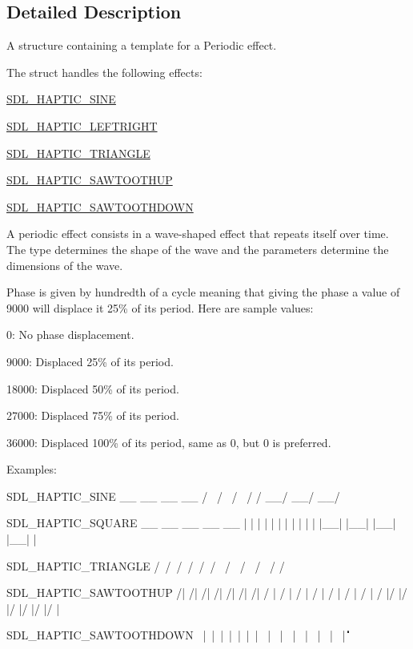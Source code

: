 \subsection{Detailed Description}
A structure containing a template for a Periodic effect. 

The struct handles the following effects\-:
\begin{DoxyItemize}
\item \hyperlink{_s_d_l__haptic_8h_aa6d75adbfcdda5075078e7a2849da5c0}{S\-D\-L\-\_\-\-H\-A\-P\-T\-I\-C\-\_\-\-S\-I\-N\-E}
\item \hyperlink{_s_d_l__haptic_8h_ae047624d8458ff6400887c37a36f86d3}{S\-D\-L\-\_\-\-H\-A\-P\-T\-I\-C\-\_\-\-L\-E\-F\-T\-R\-I\-G\-H\-T}
\item \hyperlink{_s_d_l__haptic_8h_ae8123eaa51511507375ba6ef9220fa46}{S\-D\-L\-\_\-\-H\-A\-P\-T\-I\-C\-\_\-\-T\-R\-I\-A\-N\-G\-L\-E}
\item \hyperlink{_s_d_l__haptic_8h_ab8e3f40f3c2bcee8905d13b634363c3f}{S\-D\-L\-\_\-\-H\-A\-P\-T\-I\-C\-\_\-\-S\-A\-W\-T\-O\-O\-T\-H\-U\-P}
\item \hyperlink{_s_d_l__haptic_8h_afd64aa747034a7ccf4b55f6246525701}{S\-D\-L\-\_\-\-H\-A\-P\-T\-I\-C\-\_\-\-S\-A\-W\-T\-O\-O\-T\-H\-D\-O\-W\-N}
\end{DoxyItemize}

A periodic effect consists in a wave-\/shaped effect that repeats itself over time. The type determines the shape of the wave and the parameters determine the dimensions of the wave.

Phase is given by hundredth of a cycle meaning that giving the phase a value of 9000 will displace it 25\% of its period. Here are sample values\-:
\begin{DoxyItemize}
\item 0\-: No phase displacement.
\item 9000\-: Displaced 25\% of its period.
\item 18000\-: Displaced 50\% of its period.
\item 27000\-: Displaced 75\% of its period.
\item 36000\-: Displaced 100\% of its period, same as 0, but 0 is preferred.
\end{DoxyItemize}

Examples\-: \begin{DoxyVerb}SDL_HAPTIC_SINE
  __      __      __      __
 /  \    /  \    /  \    /
/    \__/    \__/    \__/

SDL_HAPTIC_SQUARE
 __    __    __    __    __
|  |  |  |  |  |  |  |  |  |
|  |__|  |__|  |__|  |__|  |

SDL_HAPTIC_TRIANGLE
  /\    /\    /\    /\    /\
 /  \  /  \  /  \  /  \  /
/    \/    \/    \/    \/

SDL_HAPTIC_SAWTOOTHUP
  /|  /|  /|  /|  /|  /|  /|
 / | / | / | / | / | / | / |
/  |/  |/  |/  |/  |/  |/  |

SDL_HAPTIC_SAWTOOTHDOWN
\  |\  |\  |\  |\  |\  |\  |
 \ | \ | \ | \ | \ | \ | \ |
  \|  \|  \|  \|  \|  \|  \|
\end{DoxyVerb}


